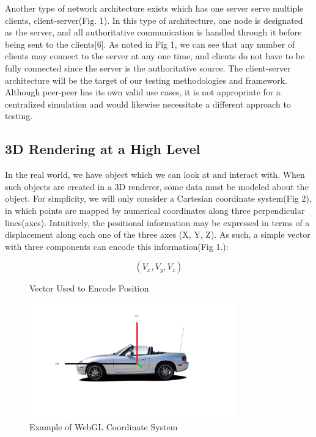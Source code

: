 \documentclass[conference]{IEEEtran}
\begin{document}
Another type of network architecture exists which has one server serve multiple clients, client-server(Fig. 1). In this type of architecture, one node is designated as the server,
and all authoritative communication is handled through it before being sent to the clients[6]. As noted in Fig 1, we can see that any number of clients may connect to the server
at any one time, and clients do not have to be fully connected since the server is the authoritative source. The client-server architecture will be the target of our testing methodologies
and framework. Although peer-peer has its own valid use cases, it is not appropriate for a centralized simulation and would likewise necessitate a different approach to testing.

\subsection{3D Rendering at a High Level}

In the real world, we have object which we can look at and interact with. When such objects are created in a 3D renderer,
some data must be modeled about the object. For simplicity, we will only consider a Cartesian coordinate system(Fig 2), in which points are mapped
by numerical coordinates along three perpendicular lines(axes). Intuitively, the positional information may be expressed in terms of a displacement
along each one of the three axes (X, Y, Z). As such, a simple vector with three components can encode this information(Fig 1.):

\begin{figure}[htbp]
\[ (V_{x}, V_{y}, V_{z}) \]
\caption{Vector Used to Encode Position}
\end{figure}

\begin{figure}[htbp]
\centerline{\includegraphics [width = 9cm, height = 5cm] {fig1.png}}
\caption{Example of WebGL Coordinate System}
\end{figure}
\end{document}
